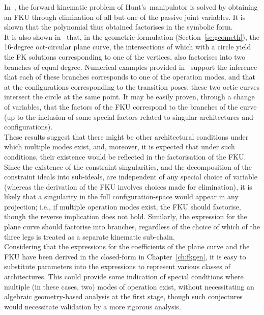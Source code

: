 \documentclass[DD]{iitmdiss}
\newcommand{\mref}[1]{\ref{#1}}
\newcommand{\mcite}[1]{\cite{#1}}
\begin{document}
In~\mcite{srivatsan2014}, the forward kinematic problem of Hunt's~\rps manipulator is solved by obtaining an FKU through elimination of all but one of the passive joint variables. It is shown that the polynomial thus obtained factorises in the symbolic form.\\
It is also shown in~\mcite{tk2017a} that, in the geometric formulation (Section~\mref{sc:geometh}), the 16-degree oct-circular plane curve, the intersections of which with a circle yield the FK solutions corresponding to one of the vertices, also factorises into two branches of equal degree. Numerical examples provided in~\mcite{tk2017a, tk2017b} support the inference that each of these branches corresponds to one of the operation modes, and that at the configurations corresponding to the transition poses, these two octic curves intersect the circle at the same point. It may be easily proven, through a change of variables, that the factors of the FKU correspond to the branches of the curve (up to the inclusion of some special factors related to singular architectures and configurations).\\
These results suggest that there might be other architectural conditions under which multiple modes exist, and, moreover, it is expected that under such conditions, their existence would be reflected in the factorisation of the FKU. Since the existence of the constraint singularities, and the decomposition of the constraint ideals into sub-ideals, are independent of any special choice of variable (whereas the derivation of the FKU involves choices made for elimination), it is likely that a singularity in the full configuration-space would appear in any projection; i.e., if multiple operation modes exist, the FKU should factorise, though the reverse implication does not hold. Similarly, the expression for the plane curve should factorise into branches, regardless of the choice of which of the three legs is treated as a separate kinematic sub-chain.\\
Considering that the expressions for the coefficients of the plane curve and the FKU have been derived in the closed-form in Chapter~\mref{ch:fkgen}, it is easy to substitute parameters into the expressions to represent various classes of architectures. This could provide some indication of special conditions where multiple (in these cases, two) modes of operation exist, without necessitating an algebraic geometry-based analysis at the first stage, though such conjectures would necessitate validation by a more rigorous analysis.
% 
\end{document}
